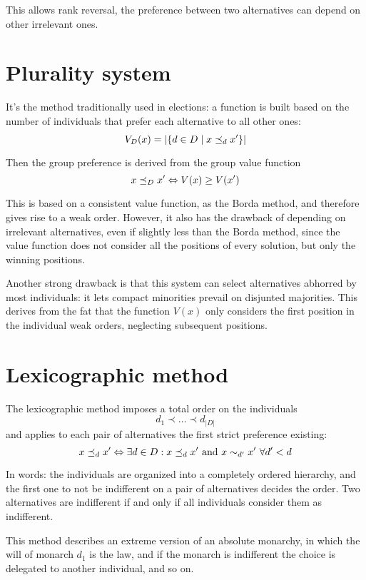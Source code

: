 This allows rank reversal, the preference between two alternatives can depend on other irrelevant ones.

\section{Plurality system}

It's the method traditionally used in elections: a function is built based on the number of individuals that prefer each alternative to all other ones:
$$ V_D (x) = \left|\left\{d \in D \mid x \preceq_{d} x' \right\}\right|$$

Then the group preference is derived from the group value function
$$ x \preceq_{D} x' \Leftrightarrow V(x) \geq V(x') $$

This is based on a consistent value function, as the Borda method, and therefore gives rise to a weak order. However, it also has the drawback of depending on irrelevant alternatives, even if slightly less than the Borda method, since the value function does not consider all the positions of every solution, but only the winning positions.

Another strong drawback is that this system can select alternatives abhorred by most individuals: it lets compact minorities prevail on disjunted majorities. This derives from the fat that the function $V(x)$ only considers the first position in the individual weak orders, neglecting subsequent positions.

\section{Lexicographic method}

The lexicographic method imposes a total order on the individuals
$$ d_1 \prec \dots \prec d_{|D|} $$
and applies to each pair of alternatives the first strict preference existing:
$$ x \preceq_{d} x' \Leftrightarrow \exists d \in D : x \preceq_{d} x' \text{ and } x \sim_{d'} x' \ \forall d' < d $$

In words: the individuals are organized into a completely ordered hierarchy, and the first one to not be indifferent on a pair of alternatives decides the order. Two alternatives are indifferent if and only if all individuals consider them as indifferent.

This method describes an extreme version of an absolute monarchy, in which the will of monarch $d_1$ is the law, and if the monarch is indifferent the choice is delegated to another individual, and so on.

